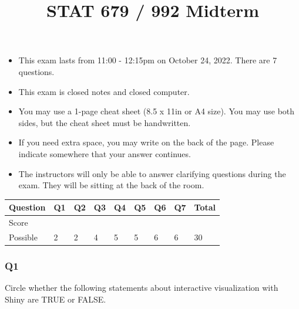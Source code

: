 \documentclass[
]{article}
\title{STAT 679 / 992 Midterm}
\author{}
\date{\vspace{-2.5em}}
\providecommand{\tightlist}{%
  \setlength{\itemsep}{0pt}\setlength{\parskip}{0pt}}
\begin{document}
\maketitle

\begin{itemize}
\tightlist
\item
  This exam lasts from 11:00 - 12:15pm on October 24, 2022. There are 7
  questions.
\item
  This exam is closed notes and closed computer.
\item
  You may use a 1-page cheat sheet (8.5 x 11in or A4 size). You may use
  both sides, but the cheat sheet must be handwritten.
\item
  If you need extra space, you may write on the back of the page. Please
  indicate somewhere that your answer continues.
\item
  The instructors will only be able to answer clarifying questions
  during the exam. They will be sitting at the back of the room.
\end{itemize}

\begin{longtable}[]{@{}lllllllll@{}}
\toprule()
Question & Q1 & Q2 & Q3 & Q4 & Q5 & Q6 & Q7 & Total \\
\midrule()
\endhead
Score & & & & & & & & \\
Possible & 2 & 2 & 4 & 5 & 5 & 6 & 6 & 30 \\
\bottomrule()
\end{longtable}

\hypertarget{q1}{%
\subsubsection{Q1}\label{q1}}

Circle whether the following statements about interactive visualization
with Shiny are TRUE or FALSE.
\end{document}
